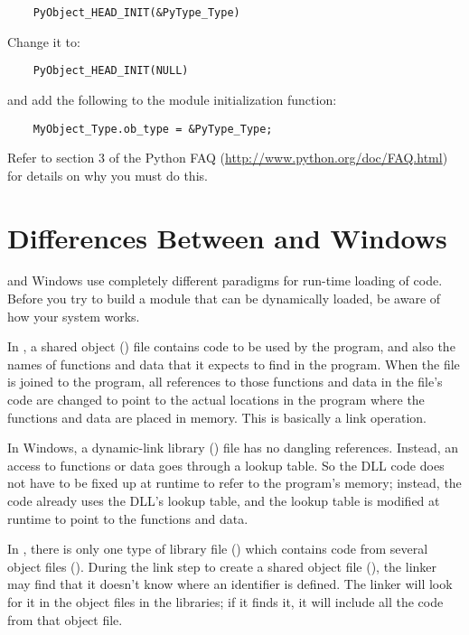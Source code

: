 \documentclass{manual}
\begin{document}
\begin{verbatim}
    PyObject_HEAD_INIT(&PyType_Type)
\end{verbatim}

Change it to:

\begin{verbatim}
    PyObject_HEAD_INIT(NULL)
\end{verbatim}

and add the following to the module initialization function:

\begin{verbatim}
    MyObject_Type.ob_type = &PyType_Type;
\end{verbatim}

Refer to section 3 of the Python FAQ
(\url{http://www.python.org/doc/FAQ.html}) for details on why you must
do this.


\section{Differences Between \UNIX{} and Windows
         \label{dynamic-linking}}


\UNIX{} and Windows use completely different paradigms for run-time
loading of code.  Before you try to build a module that can be
dynamically loaded, be aware of how your system works.

In \UNIX{}, a shared object () file contains code to be used by the
program, and also the names of functions and data that it expects to
find in the program.  When the file is joined to the program, all
references to those functions and data in the file's code are changed
to point to the actual locations in the program where the functions
and data are placed in memory.  This is basically a link operation.

In Windows, a dynamic-link library () file has no dangling
references.  Instead, an access to functions or data goes through a
lookup table.  So the DLL code does not have to be fixed up at runtime
to refer to the program's memory; instead, the code already uses the
DLL's lookup table, and the lookup table is modified at runtime to
point to the functions and data.

In \UNIX{}, there is only one type of library file () which
contains code from several object files ().  During the link
step to create a shared object file (), the linker may find
that it doesn't know where an identifier is defined.  The linker will
look for it in the object files in the libraries; if it finds it, it
will include all the code from that object file.
\end{document}
